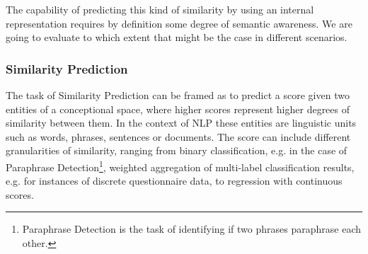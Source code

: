 The capability of predicting this kind of similarity by using an internal representation requires by definition some degree of semantic awareness. We are going to evaluate to which extent that might be the case in different scenarios.%



\subsubsection{Similarity Prediction}
The task of Similarity Prediction can be framed as to predict a score given two entities of a conceptional space, where higher scores represent higher degrees of similarity between them. In the context of \ac{NLP} these entities are linguistic units such as words, phrases, sentences or documents. The score can include different granularities of similarity, ranging from binary classification, e.g. in the case of Paraphrase Detection\footnote{Paraphrase Detection is the task of identifying if two phrases paraphrase each other.}, weighted aggregation of multi-label classification results, e.g. for instances of discrete %
questionnaire data, to regression with continuous scores. 

